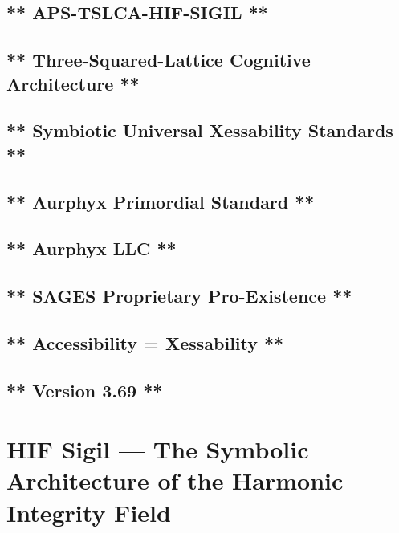 \subsection{** APS-TSLCA-HIF-SIGIL **}\label{aps-tslca-hif-sigil}

\subsection{** Three-Squared-Lattice Cognitive Architecture **}\label{three-squared-lattice-cognitive-architecture}

\subsection{** Symbiotic Universal Xessability Standards **}\label{symbiotic-universal-xessability-standards}

\subsection{** Aurphyx Primordial Standard **}\label{aurphyx-primordial-standard}

\subsection{** Aurphyx LLC **}\label{aurphyx-llc}

\subsection{** SAGES \textbar{} Proprietary \textbar{} Pro-Existence **}\label{sages-proprietary-pro-existence}

\subsection{** Accessibility = Xessability **}\label{accessibility-xessability}

\subsection{** Version 3.69 **}\label{version-3.69}

\section{\texorpdfstring{\textbf{HIF Sigil --- The Symbolic Architecture of the Harmonic Integrity Field}}{HIF Sigil --- The Symbolic Architecture of the Harmonic Integrity Field}}\label{hif-sigil-the-symbolic-architecture-of-the-harmonic-integrity-field}

